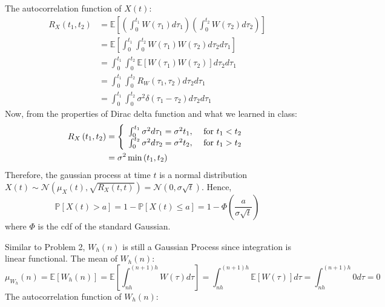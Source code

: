 \documentclass{cisXXX} %
\begin{document}
The autocorrelation function of $X ( t )$:
$$
\begin{aligned} R _ { X } \left( t _ { 1 } , t _ { 2 } \right) & = \mathbb { E } \left[ \left( \int _ { 0 } ^ { t _ { 1 } } W \left( \tau _ { 1 } \right) d \tau _ { 1 } \right) \left( \int _ { 0 } ^ { t _ { 2 } } W \left( \tau _ { 2 } \right) d \tau _ { 2 } \right) \right] \\ & = \mathbb { E } \left[ \int _ { 0 } ^ { t _ { 1 } } \int _ { 0 } ^ { t _ { 2 } } W \left( \tau _ { 1 } \right) W \left( \tau _ { 2 } \right) d \tau _ { 2 } d \tau _ { 1 } \right] \\ & = \int _ { 0 } ^ { t _ { 1 } } \int _ { 0 } ^ { t _ { 2 } } \mathbb { E } \left[ W \left( \tau _ { 1 } \right) W \left( \tau _ { 2 } \right) \right] d \tau _ { 2 } d \tau _ { 1 } \\ & = \int _ { 0 } ^ { t _ { 1 } } \int _ { 0 } ^ { t _ { 2 } } R _ { W } \left( \tau _ { 1 } , \tau _ { 2 } \right) d \tau _ { 2 } d \tau _ { 1 } \\ & = \int _ { 0 } ^ { t _ { 1 } } \int _ { 0 } ^ { t _ { 2 } } \sigma ^2 \delta \left( \tau _ { 1 } - \tau _ { 2 } \right) d \tau _ { 2 } d \tau _ { 1 } \end{aligned}
$$
Now, from the properties of Dirac delta function and what we learned in class:
\begin{align*}
R _ { X } \left( t _ { 1 } , t _ { 2 } \right) &= \left\{ \begin{array} { l l } { \int _ { 0 } ^ { t _ { 1 } } \sigma ^ { 2 } d \tau _ { 1 } = \sigma ^ { 2 } t _ { 1 } , } & { \text { for } t _ { 1 } < t _ { 2 } } \\ { \int _ { 0 } ^ { t _ { 2 } } \sigma ^ { 2 } d \tau _ { 2 } = \sigma ^ { 2 } t _ { 2 } , } & { \text { for } t _ { 1 } > t _ { 2 } } \end{array} \right. \\ 
&= \sigma ^ { 2 } \min \left( t _ { 1 } , t _ { 2 } \right)
\end{align*}
Therefore, the gaussian process at time $t$ is a normal distribution $X ( t ) \sim \mathcal { N } \left( \mu_X ( t ) , \sqrt { R _ { X } ( t , t ) } \right) = \mathcal { N } \left( 0, \sigma \sqrt {t} \right)$. Hence,
$$
\mathbb { P } [ X ( t ) > a ] = 1 - \mathbb { P } [ X ( t ) \leq a ] = 1 - \Phi \left( \frac { a } { \sigma \sqrt { t } } \right)
$$
where $\Phi$ is the cdf of the standard Gaussian.

\HWproblem
Similar to Problem 2, $W _ { h } ( n )$ is still a Gaussian Process since integration is linear functional.
The mean of  $W _ { h } ( n )$:
$$
\mu _ { W _ { h } } ( n ) = \mathbb { E } \left[ W _ { h } ( n ) \right] = \mathbb { E } \left[ \int _ { n h } ^ { ( n + 1 ) h } W ( \tau ) d \tau \right] = \int _ { n h } ^ { ( n + 1 ) h } \mathbb { E } [ W ( \tau ) ] d \tau = \int _ { n h } ^ { ( n + 1 ) h } 0 d \tau = 0
$$
The autocorrelation function of  $W _ { h } ( n )$:
\end{document}
